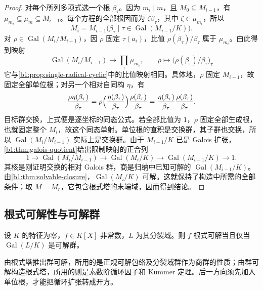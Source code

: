 \begin{proof}
	对每个所列多项式选一个根 \(\beta_\tau\)。因为 \(m_i\mid m\)，且 \(M_0\subseteq M_{i-1}\)，有 \(\mu_{m_i}\subseteq\mu_m\subseteq M_{i-1}\)。每个方程的全部根因而为 \(\zeta\beta_\tau\)，其中 \(\zeta\in\mu_{m_i}\)，所以
	\[
		M_i=M_{i-1}\bigl(\beta_\tau\mid\tau\in\operatorname{Gal}(M_{i-1}/K)\bigr).
	\]
	对 \(\rho\in\operatorname{Gal}(M_i/M_{i-1})\)，因 \(\rho\) 固定 \(\tau(a_i)\)，比值 \(\rho(\beta_\tau)/\beta_\tau\) 属于 \(\mu_{m_i}\)。由此得到映射
	\[
		\operatorname{Gal}(M_i/M_{i-1})\longrightarrow \prod_{\tau}\mu_{m_i},\qquad \rho\longmapsto\bigl(\rho(\beta_\tau)/\beta_\tau\bigr)_\tau
	\]
	它与\cref{b1:prop:single-radical-cyclic}中的比值映射相同。具体地，\(\rho\) 固定 \(M_{i-1}\)，故固定全部单位根；对另一个相对自同构 \(\eta\)，有
	\[
		\frac{\rho\eta(\beta_\tau)}{\beta_\tau} =\rho\Bigl(\frac{\eta(\beta_\tau)}{\beta_\tau}\Bigr) \frac{\rho(\beta_\tau)}{\beta_\tau} =\frac{\eta(\beta_\tau)}{\beta_\tau} \frac{\rho(\beta_\tau)}{\beta_\tau}.
	\]
	目标群交换，上式便是逐坐标的同态公式。若全部比值为 \(1\)，\(\rho\) 固定全部生成根，也就固定整个 \(M_i\)，故这个同态单射。单位根的直积是交换群，其子群也交换，所以 \(\operatorname{Gal}(M_i/M_{i-1})\) 实际上是交换群。由于 \(M_{i-1}/K\) 已是 Galois 扩张，\cref{b1:thm:galois-quotient}给出限制映射的正合列
	\[
		1\longrightarrow\operatorname{Gal}(M_i/M_{i-1}) \longrightarrow\operatorname{Gal}(M_i/K) \longrightarrow\operatorname{Gal}(M_{i-1}/K)\longrightarrow1.
	\]
	其核是刚证明交换的相对 Galois 群，商是归纳中已知可解的 \(\operatorname{Gal}(M_{i-1}/K)\)。由\cref{b1:thm:solvable-closure}，\(\operatorname{Gal}(M_i/K)\) 可解。这就保持了构造中所需的全部条件；取 \(M=M_r\)，它包含根式塔的末端域，因而得到结论。
\end{proof}

\subsection{根式可解性与可解群}
\label{b1:subsec:2102:04}

\begin{theorem}[根式可解性判据]\label{b1:thm:radical-solvability}
	设 \(K\) 的特征为零，\(f\in K[X]\) 非常数，\(L\) 为其分裂域。则 \(f\) 根式可解当且仅当 \(\operatorname{Gal}(L/K)\) 是可解群。
\end{theorem}

由根式塔推出群可解，所用的是正规可解包络及分裂域群作为商群的性质；由群可解构造根式塔，所用的则是素数阶循环因子和 Kummer 定理。后一方向须先加入单位根，才能把循环扩张转成开方。

